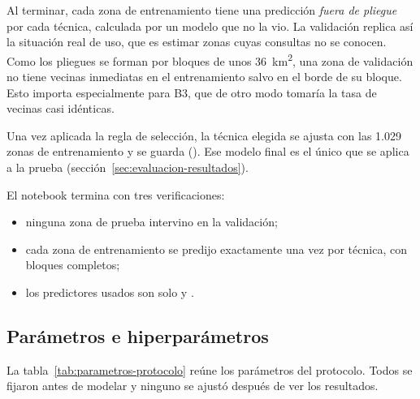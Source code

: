 Al terminar, cada zona de entrenamiento tiene una predicción \emph{fuera de pliegue} por
cada técnica, calculada por un modelo que no la vio. La validación replica así la situación
real de uso, que es estimar zonas cuyas consultas no se conocen. Como los pliegues se forman
por bloques de unos 36~km\textsuperscript{2}, una zona de validación no tiene vecinas
inmediatas en el entrenamiento salvo en el borde de su bloque. Esto importa especialmente
para B3, que de otro modo tomaría la tasa de vecinas casi idénticas.

Una vez aplicada la regla de selección, la técnica elegida se ajusta con las 1.029 zonas
de entrenamiento y se guarda (). Ese modelo final es el único que
se aplica a la prueba (sección~\ref{sec:evaluacion-resultados}).

El notebook termina con tres verificaciones:
\begin{itemize}
  \item ninguna zona de prueba intervino en la validación;
  \item cada zona de entrenamiento se predijo exactamente una vez por técnica, con bloques
        completos;
  \item los predictores usados son solo  y .
\end{itemize}

\subsection{Parámetros e hiperparámetros}
\label{sec:hiperparametros}

La tabla~\ref{tab:parametros-protocolo} reúne los parámetros del protocolo. Todos se
fijaron antes de modelar y ninguno se ajustó después de ver los resultados.

